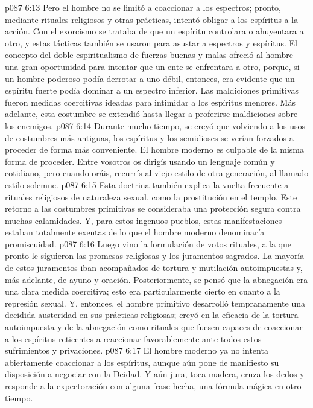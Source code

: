\vs p087 6:13 Pero el hombre no se limitó a coaccionar a los espectros; pronto, mediante rituales religiosos y otras prácticas, intentó obligar a los espíritus a la acción. Con el exorcismo se trataba de que un espíritu controlara o ahuyentara a otro, y estas tácticas también se usaron para asustar a espectros y espíritus. El concepto del doble espiritualismo de fuerzas buenas y malas ofreció al hombre una gran oportunidad para intentar que un ente se enfrentara a otro, porque, si un hombre poderoso podía derrotar a uno débil, entonces, era evidente que un espíritu fuerte podía dominar a un espectro inferior. Las maldiciones primitivas fueron medidas coercitivas ideadas para intimidar a los espíritus menores. Más adelante, esta costumbre se extendió hasta llegar a proferirse maldiciones sobre los enemigos.
\vs p087 6:14 Durante mucho tiempo, se creyó que volviendo a los usos de costumbres más antiguas, los espíritus y los semidioses se verían forzados a proceder de forma más conveniente. El hombre moderno es culpable de la misma forma de proceder. Entre vosotros os dirigís usando un lenguaje común y cotidiano, pero cuando oráis, recurrís al viejo estilo de otra generación, al llamado estilo solemne.
\vs p087 6:15 Esta doctrina también explica la vuelta frecuente a rituales religiosos de naturaleza sexual, como la prostitución en el templo. Este retorno a las costumbres primitivas se consideraba una protección segura contra muchas calamidades. Y, para estos ingenuos pueblos, estas manifestaciones estaban totalmente exentas de lo que el hombre moderno denominaría promiscuidad.
\vs p087 6:16 Luego vino la formulación de votos rituales, a la que pronto le siguieron las promesas religiosas y los juramentos sagrados. La mayoría de estos juramentos iban acompañados de tortura y mutilación autoimpuestas y, más adelante, de ayuno y oración. Posteriormente, se pensó que la abnegación era una clara medida coercitiva; esto era particularmente cierto en cuanto a la represión sexual. Y, entonces, el hombre primitivo desarrolló tempranamente una decidida austeridad en sus prácticas religiosas; creyó en la eficacia de la tortura autoimpuesta y de la abnegación como rituales que fuesen capaces de coaccionar a los espíritus reticentes a reaccionar favorablemente ante todos estos sufrimientos y privaciones.
\vs p087 6:17 \pc El hombre moderno ya no intenta abiertamente coaccionar a los espíritus, aunque aún pone de manifiesto su disposición a negociar con la Deidad. Y aún jura, toca madera, cruza los dedos y responde a la expectoración con alguna frase hecha, una fórmula mágica en otro tiempo.
